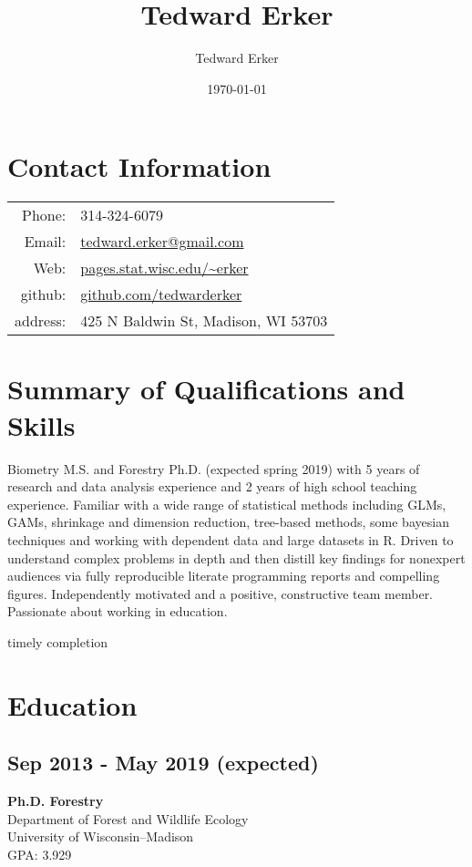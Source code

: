 \documentclass{article}
\author{Tedward Erker}
\date{\today}
\title{Tedward Erker}
\begin{document}
\maketitle
\section*{Contact Information}
\label{sec:org163412b}
\begin{center}
\begin{tabular}{rp{}}
Phone: & 314-324-6079\\
Email: & \href{mailto:erker@wisc.edu}{tedward.erker@gmail.com}\\
Web: & \href{http://pages.stat.wisc.edu/\~erker/}{pages.stat.wisc.edu/\textasciitilde{}erker}\\
github: & \href{https://github.com/tedwarderker}{github.com/tedwarderker}\\
address: & 425 N Baldwin St, Madison, WI 53703\\
\end{tabular}
\end{center}


\section*{Summary of Qualifications and Skills}
\label{sec:orga2f15aa}

Biometry M.S. and Forestry Ph.D. (expected spring 2019) with 5 years
of research and data analysis experience and 2 years of high school
teaching experience.  Familiar with a wide range of statistical
methods including GLMs, GAMs, shrinkage and dimension reduction,
tree-based methods, some bayesian techniques and working with
dependent data and large datasets in R.  Driven to understand complex
problems in depth and then distill key findings for nonexpert
audiences via fully reproducible literate programming reports and
compelling figures.  Independently motivated and a positive,
constructive team member.  Passionate about working in education.

timely completion

\section*{Education}
\label{sec:org118a7ee}
\subsection*{Sep 2013 - May 2019 (expected)}
\label{sec:org91b2d31}
\textbf{Ph.D. Forestry} \\
Department of Forest and Wildlife Ecology \\
University of Wisconsin--Madison \\
GPA: 3.929
\end{document}
